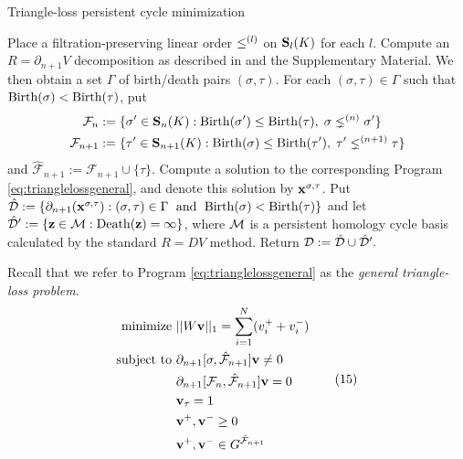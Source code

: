 \documentclass[utf8]{frontiers_suppmat} %
\begin{document}
\begin{algorithm}
\caption{Triangle-loss persistent cycle minimization}
\label{alg:rdvvolumeoptimization}
\begin{algorithmic}[1]
\STATE Place a filtration-preserving linear order $\le^{(l)}$ on $\mathbf{S}_l(K)$ for each $l$.
\STATE Compute an $R = \partial_{n+1} V$ decomposition as described in \cite{cohen2006vines} and the Supplementary Material.  We then obtain a set $\Gamma$ 
of birth/death pairs $(\sigma, \tau)$.
\STATE For each $(\sigma, \tau) \in \Gamma$ such that $\mathrm{Birth}(\sigma) < \mathrm{Birth}(\tau)$,  put 
    \begin{align*}
        \mathcal{F}_n &:= \{\sigma' \in \mathbf{S}_n(K) : \mathrm{Birth}(\sigma') \le \mathrm{Birth}(\tau), \; \sigma \lneq^{(n)} \sigma'\} 
        \\
        \mathcal{F}_{n+1} &: = \{ \tau' \in \mathbf{S}_{n+1}(K) : \mathrm{Birth}(\sigma) \le \mathrm{Birth}(\tau'), \; \tau' \lneq^{(n+1)} \tau \} 
    \end{align*}
    and ${\hat {\mathcal{F}}}_{n+1}:= \mathcal{F}_{n+1} \cup \{\tau\}$.  Compute a  solution to the corresponding Program \eqref{eq:trianglelossgeneral}, and denote this solution by  $\mathbf{x}^{\sigma, \tau}$. 
    \STATE Put   
        $
            \hat {\mathcal D}: = \{ \partial_{n+1} (\mathbf{x}^{\sigma, \tau}) : (\sigma, \tau ) \in  \Gamma \; \text{ and } \; \mathrm{Birth}(\sigma) < \mathrm{Birth}(\tau)\}$ 
            and let $\hat {\mathcal D}' := \{ {\mathbf z} \in \mathcal M : \mathrm{Death}({\mathbf z}) = \infty  \}$, where $\mathcal M$ is a persistent homology cycle basis calculated by the standard $R=DV$ method.
    \STATE Return $\mathcal D: = \hat {\mathcal D} \cup \hat {\mathcal D}'.$
\end{algorithmic}
\end{algorithm}

Recall that we refer to Program \eqref{eq:trianglelossgeneral} as the  \emph{general triangle-loss problem}.
\begin{align}
\begin{split}
 \text{minimize } & ||W \mathbf{v} ||_1 = \sum_{i=1}^N (v_i^+ + v_i^-)  \\
\text{subject to } &  \partial_{n+1}[ \sigma , \hat {\mathcal{F}}_{n+1} ] \mathbf{v} \neq 0     \\
&  \partial_{n+1}[\mathcal{F}_n, \hat {\mathcal{F}}_{n+1} ] \mathbf{v} = 0 \\
 & \mathbf{v}_{\tau} = 1\\
     & \mathbf{v}^+, \mathbf{v}^- \ge 0 \\
& \mathbf{v}^+, \mathbf{v}^- \in G^{ \hat {\mathcal{F}}_{n+1}}
\end{split}
\tag{15}
\label{eq:trianglelossgeneral}
\end{align} 
\end{document}
